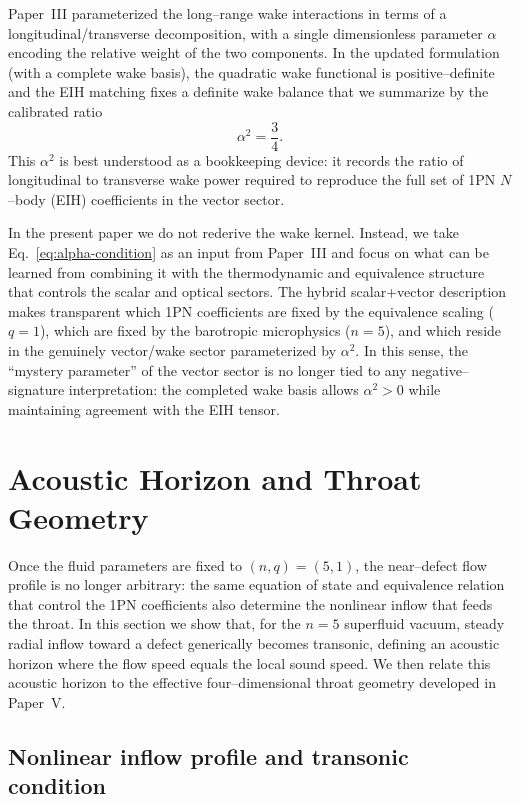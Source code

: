 \documentclass[11pt]{article}
\begin{document}
Paper~III parameterized the long--range wake interactions in terms of a
longitudinal/transverse decomposition, with a single dimensionless parameter
\(\alpha\) encoding the relative weight of the two components.  In the updated
formulation (with a complete wake basis), the quadratic wake functional is
positive--definite and the EIH matching fixes a definite wake balance that we
summarize by the calibrated ratio
\begin{equation}
  \alpha^2 = \frac{3}{4}.
  \label{eq:alpha-condition}
\end{equation}
This \(\alpha^2\) is best understood as a bookkeeping device: it records the
ratio of longitudinal to transverse wake power required to reproduce the full
set of 1PN $N$--body (EIH) coefficients in the vector sector.

In the present paper we do not rederive the wake kernel.  Instead, we take
Eq.~\eqref{eq:alpha-condition} as an input from Paper~III and focus on what can
be learned from combining it with the thermodynamic and equivalence structure
that controls the scalar and optical sectors.  The hybrid scalar+vector
description makes transparent which 1PN coefficients are fixed by the
equivalence scaling (\(q=1\)), which are fixed by the barotropic microphysics
(\(n=5\)), and which reside in the genuinely vector/wake sector parameterized
by \(\alpha^2\).  In this sense, the ``mystery parameter'' of the vector sector
is no longer tied to any negative--signature interpretation: the completed wake
basis allows \(\alpha^2>0\) while maintaining agreement with the EIH tensor.

\section{Acoustic Horizon and Throat Geometry}
\label{sec:acoustic_horizon}

Once the fluid parameters are fixed to \((n,q) = (5,1)\), the near–defect
flow profile is no longer arbitrary: the same equation of state and
equivalence relation that control the 1PN coefficients also determine the
nonlinear inflow that feeds the throat.  In this section we show that, for
the \(n=5\) superfluid vacuum, steady radial inflow toward a defect
generically becomes transonic, defining an acoustic horizon where the flow
speed equals the local sound speed.  We then relate this acoustic horizon to
the effective four–dimensional throat geometry developed in Paper~V.

\subsection{Nonlinear inflow profile and transonic condition}
\label{subsec:acoustic-inflow}
\end{document}
